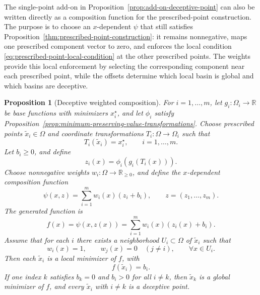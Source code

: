 \documentclass[11pt,a4paper]{article}
\theoremstyle{remark}
\theoremstyle{plain}
\newtheorem{proposition}{Proposition}
\begin{document}
The single-point add-on in
Proposition~\ref{prop:add-on-deceptive-point} can also be written directly as a
composition function for the prescribed-point construction. The purpose is to
choose an \(x\)-dependent \(\psi\) that still satisfies
Proposition~\ref{thm:prescribed-point-construction}: it remains nonnegative,
maps one prescribed component vector to zero, and enforces the local condition
\eqref{eq:prescribed-point-local-condition} at the other prescribed points.
The weights provide this local enforcement by selecting the corresponding
component near each prescribed point, while the offsets determine which local
basin is global and which basins are deceptive.

\begin{proposition}[Deceptive weighted composition]
	\label{prop:deceptive-weighted-composition}
	For \(i=1,\ldots,m\), let \(g_i:\Omega_i\to\mathbb{R}\) be base functions
	with minimizers \(x_i^\star\), and let \(\phi_i\) satisfy
	Proposition~\ref{prop:minimum-preserving-value-transformations}.
	Choose prescribed points \(\tilde x_i\in\Omega\) and coordinate
	transformations \(T_i:\Omega\to\Omega_i\) such that
	\[
	T_i(\tilde x_i)=x_i^\star,
	\qquad
	i=1,\ldots,m.
	\]
	Let \(b_i\ge0\), and define
	\[
	z_i(x)=\phi_i(g_i(T_i(x))).
	\]
	Choose nonnegative weights \(w_i:\Omega\to\mathbb{R}_{\ge0}\), and define the
	\(x\)-dependent composition function
	\[
	\psi(x,z)
	=
	\sum_{i=1}^m w_i(x)(z_i+b_i),
	\qquad
	z=(z_1,\ldots,z_m).
	\]
	The generated function is
	\[
	f(x)=\psi(x,z(x))
	=
	\sum_{i=1}^m w_i(x)(z_i(x)+b_i).
	\]
	Assume that for each \(i\) there exists a neighborhood \(U_i\subset\Omega\)
	of \(\tilde x_i\) such that
	\[
	w_i(x)=1,
	\qquad
	w_j(x)=0\quad (j\ne i),
	\qquad
	\forall x\in U_i.
	\]
	Then each \(\tilde x_i\) is a local minimizer of \(f\), with
	\[
	f(\tilde x_i)=b_i.
	\]
	If one index \(k\) satisfies \(b_k=0\) and \(b_i>0\) for all \(i\ne k\), then
	\(\tilde x_k\) is a global minimizer of \(f\), and every \(\tilde x_i\) with
	\(i\ne k\) is a deceptive point. 
\end{proposition}
\end{document}
